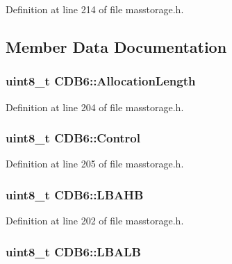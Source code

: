 \-Definition at line 214 of file masstorage.\-h.



\subsection{\-Member \-Data \-Documentation}
\hypertarget{struct_c_d_b6_a49d35d920a46db55bc300ee25f6065ef}{
\subsubsection[{\-Allocation\-Length}]{\setlength{\rightskip}{0pt plus 5cm}uint8\-\_\-t {\bf \-C\-D\-B6\-::\-Allocation\-Length}}}\label{struct_c_d_b6_a49d35d920a46db55bc300ee25f6065ef}


\-Definition at line 204 of file masstorage.\-h.

\hypertarget{struct_c_d_b6_a8629bc31675353132e17e5e37b3e0e41}{
\subsubsection[{\-Control}]{\setlength{\rightskip}{0pt plus 5cm}uint8\-\_\-t {\bf \-C\-D\-B6\-::\-Control}}}\label{struct_c_d_b6_a8629bc31675353132e17e5e37b3e0e41}


\-Definition at line 205 of file masstorage.\-h.

\hypertarget{struct_c_d_b6_a6a0be8910a3e8039534b8570365a4207}{
\subsubsection[{\-L\-B\-A\-H\-B}]{\setlength{\rightskip}{0pt plus 5cm}uint8\-\_\-t {\bf \-C\-D\-B6\-::\-L\-B\-A\-H\-B}}}\label{struct_c_d_b6_a6a0be8910a3e8039534b8570365a4207}


\-Definition at line 202 of file masstorage.\-h.

\hypertarget{struct_c_d_b6_a28933fcb497ecd202ea07d665be57f9c}{
\subsubsection[{\-L\-B\-A\-L\-B}]{\setlength{\rightskip}{0pt plus 5cm}uint8\-\_\-t {\bf \-C\-D\-B6\-::\-L\-B\-A\-L\-B}}}\label{struct_c_d_b6_a28933fcb497ecd202ea07d665be57f9c}



